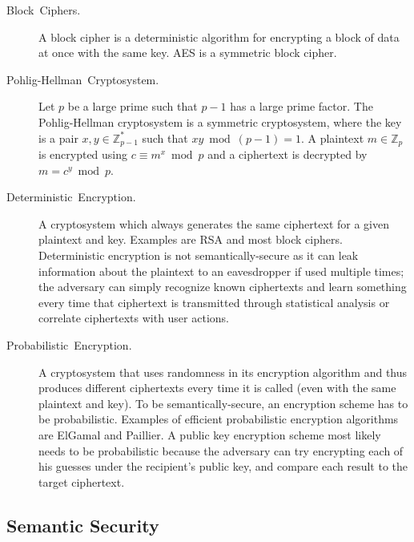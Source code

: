 \documentclass[11pt]{article}
\theoremstyle{plain}
\begin{document}
\begin{description}
	\item [{Block~Ciphers.}] A block cipher is a deterministic algorithm for
	encrypting a block of data at once with the same key. AES is a symmetric
	block cipher.
	\item [{Pohlig-Hellman~Cryptosystem.}] Let $p$ be a large prime such
	that $p-1$ has a large prime factor. The Pohlig-Hellman cryptosystem
	is a symmetric cryptosystem, where the key is a pair $x,y\in\mathbb{Z}_{p-1}^{*}$
	such that $xy\bmod(p-1)=1$. A plaintext $m\in\mathbb{Z}_{p}$ is
	encrypted using $c\equiv m^{x}\bmod p$ and a ciphertext is decrypted
	by $m=c^{y}\bmod p$.
	\item [{Deterministic~Encryption.}] A cryptosystem which always generates
	the same ciphertext for a given plaintext and key. Examples are RSA
	and most block ciphers. Deterministic encryption is not semantically-secure
	as it can leak information about the plaintext to an eavesdropper
	if used multiple times; the adversary can simply recognize known ciphertexts
	and learn something every time that ciphertext is transmitted through
	statistical analysis or correlate ciphertexts with user actions.
	\item [{Probabilistic~Encryption.}] A cryptosystem that uses randomness
	in its encryption algorithm and thus produces different ciphertexts
	every time it is called (even with the same plaintext and key). To
	be semantically-secure, an encryption scheme has to be probabilistic.
	Examples of efficient probabilistic encryption algorithms are ElGamal
	and Paillier. A public key encryption scheme most likely needs to
	be probabilistic because the adversary can try encrypting each of
	his guesses under the recipient's public key, and compare each result
	to the target ciphertext.
\end{description}

\subsection{Semantic Security}
\end{document}
